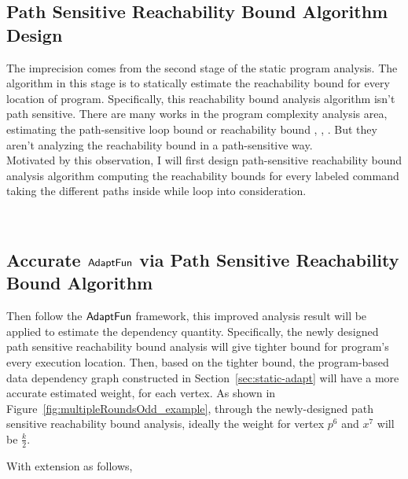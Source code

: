 \subsection{Path Sensitive Reachability Bound Algorithm Design}
\label{subsec:refine-static-psreachability}
The imprecision comes from the second stage of the static program analysis.
The algorithm in this stage is to statically estimate the 
reachability bound for every location of program.
Specifically, this reachability bound analysis algorithm isn't path sensitive. 
There are many works in the program complexity analysis area, estimating the path-sensitive loop bound 
or reachability bound
\cite{GustafssonEL05, HumenbergerJK18}, 
\cite{BrockschmidtEFFG16,AlbertAGP08,AliasDFG10,Flores-MontoyaH14}, 
\cite{GulwaniZ10, SinnZV17,GulwaniJK09, GulwaniMC09, abs-2203-04243}. 
But they aren't analyzing the reachability
bound in a path-sensitive way.
\\
Motivated by this observation, I will first design path-sensitive reachability bound analysis algorithm computing the 
reachability bounds for every labeled command taking the different paths inside while loop into consideration.

\\
\subsection{Accurate $\textsf{AdaptFun}$ via Path Sensitive Reachability Bound Algorithm}
\label{subsec:refine-static}
Then follow the $\textsf{AdaptFun}$ framework,
this improved analysis result will be applied to estimate the dependency quantity.
Specifically, the newly designed path sensitive reachability bound analysis will 
give tighter bound for program's every execution location.
Then, based on the tighter bound,
the program-based data dependency graph constructed in Section~\ref{sec:static-adapt}
will have a more accurate estimated weight, for each vertex.
%
As shown in Figure~\ref{fig:multipleRoundsOdd_example}, 
through the newly-designed path sensitive reachability bound analysis,
ideally the weight for vertex $p^6$ and $x^7$ will be $\frac{k}{2}$.

With extension as follows,
